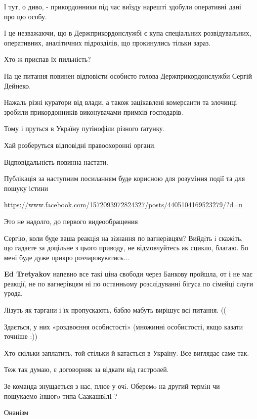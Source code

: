 \begin{itemize}
І тут, о диво, - прикордонники під час виїзду нарешті здобули оперативні дані
про цю особу.

І це незважаючи, що в Держприкордонслужбі є купа спеціальних розвідувальних,
оперативних, аналітичних підрозділів, що прокинулись тільки зараз.

Хто ж приспав їх пильність?

На це питання повинен відповісти особисто голова Держприкордонслужби Сергій Дейнеко.

Нажаль різні куратори від влади, а також зацікавлені комерсанти та злочинці
зробили прикордонників виконувачами примхів господарів.

Тому і пруться в Україну путінофіли різного ґатунку.

Хай розберуться відповідні правоохоронні органи.

Відповідальність повинна настати.

Публікація за наступним посиланням буде корисною для розуміння події та для пошуку істини

\url{https://www.facebook.com/1572093972824327/posts/4405104169523279/?d=n}

Это не надолго, до первого видеообращения


Сергiю, коли буде ваша реакцiя на зiзнання по вагнерiвцям? Вийдiть i скажiть,
що гадаєте за доцільне з цього приводу, не відмовчуйтесь як сцикло, благаю. Бо
мені буде дуже прикро розчаровуватись...

\textbf{Ed Tretyakov} напевно все такі ціна свободи через Банкову пройшла, от і
не має реакції, не по вагнерівцям ні по останньому розслідуванні бігуса по
сімейці слуги урода.

Лізуть як таргани і їх пропускають, бабло мабуть вирішує всі питання. ((

Здається, у них «роздвоєння особистості» (множинні особистості, якщо казати точніше :))

Хто скільки заплатить, той стільки й катається в Україну. Все виглядає саме так.

Теж так думаю, є договорняк за відкати від гастролей.

Зе команда знущаеться з нас, плюе у очi. Оберемo на другий термiн чи пошукаемо iншогo типа СаакашвiлI ?

Онанізм


\end{itemize}
